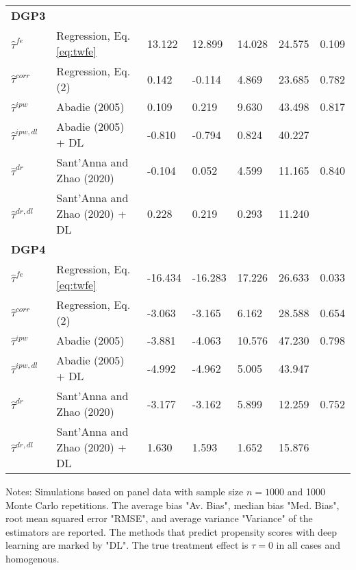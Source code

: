 \begin{table}[htbp]
{\begin{threeparttable}
\begin{tabular}{lllllll}
\addlinespace
\large \textbf{DGP3}            &                                   &            &             &      &           \\
\addlinespace
$\hat{\tau}^{fe}$ & Regression, Eq. \eqref{eq:twfe}               & 13.122       & 12.899       & 14.028 & 24.575 & 0.109    \\
$\hat{\tau}^{corr}$ & Regression, Eq. (2)             & 0.142       & -0.114       & 4.869 & 23.685 &0.782   \\
$\hat{\tau}^{ipw}$ & Abadie (2005)                    & 0.109     & 0.219      & 9.630 & 43.498  & 0.817   \\
$\hat{\tau}^{ipw,dl}$ & Abadie (2005) + DL            & -0.810       & -0.794        & 0.824 & 40.227       \\
$\hat{\tau}^{dr}$ & Sant'Anna and Zhao (2020)         & -0.104       & 0.052        & 4.599 & 11.165  &0.840    \\
$\hat{\tau}^{dr,dl}$ & Sant'Anna and Zhao (2020) + DL & 0.228       & 0.219        & 0.293 & 11.240      \\  \midrule


\addlinespace
\large \textbf{DGP4}            &                                   &            &             &      &           \\
\addlinespace
$\hat{\tau}^{fe}$ & Regression, Eq. \eqref{eq:twfe}              & -16.434       & -16.283        & 17.226 & 26.633  & 0.033   \\
$\hat{\tau}^{corr}$ & Regression, Eq. (2)             & -3.063       & -3.165       & 6.162 & 28.588  &0.654   \\
$\hat{\tau}^{ipw}$ & Abadie (2005)                    & -3.881       & -4.063        & 10.576 & 47.230    & 0.798  \\
$\hat{\tau}^{ipw,dl}$ & Abadie (2005) + DL            & -4.992       & -4.962        & 5.005 & 43.947      \\
$\hat{\tau}^{dr}$ & Sant'Anna and Zhao (2020)         &-3.177      &-3.162       & 5.899 & 12.259  &0.752    \\
$\hat{\tau}^{dr,dl}$ & Sant'Anna and Zhao (2020) + DL & 1.630       & 1.593        & 1.652 & 15.876      \\


\bottomrule
\end{tabular}
\vspace{1em}
\begin{tablenotes}
\item Notes: Simulations based on panel data with sample size $n = 1000$ and 1000 Monte Carlo repetitions. The average bias "Av. Bias", median bias "Med. Bias", root mean squared error "RMSE", and average variance "Variance" of the estimators are reported. The methods that predict propensity scores with deep learning are marked by "DL". The true treatment effect is $\tau = 0$ in all cases and homogenous.
\end{tablenotes}
\end{threeparttable}}
\end{table}
